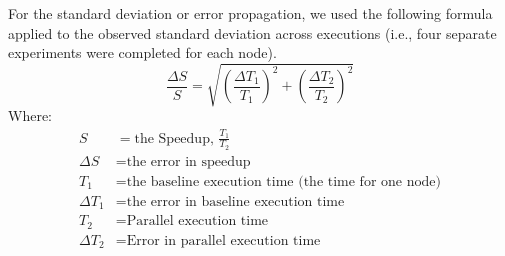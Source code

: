 \documentclass[conference]{IEEEtran}
\begin{document}
For the standard deviation or error propagation, we used the following formula applied to the observed standard deviation across executions (i.e., four separate experiments were completed for each node).
\[
    \frac{\Delta{S}}{S} = \sqrt{\left(\frac{\Delta{T_1}}{T_1}\right)^2 + \left(\frac{\Delta{T_2}}{T_2}\right)^2}
\]
Where:
\begin{align*}
    S          & = \text{the Speedup, } \frac{T_1}{T_2} \\
    \Delta S   & = \text{the error in speedup} \\
    T_1        & = \text{the baseline execution time (the time for one node)} \\
    \Delta T_1 & = \text{the error in baseline execution time} \\
    T_2 & = \text{Parallel execution time} \\
    \Delta T_2 & = \text{Error in parallel execution time}
\end{align*}



\end{document}
